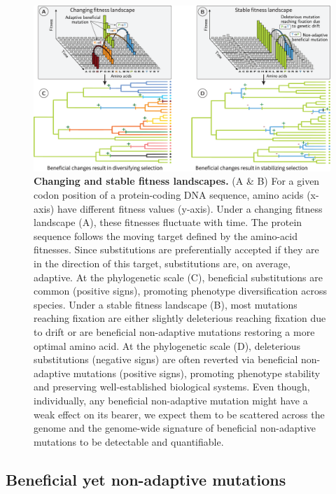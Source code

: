 \documentclass[10pt,letterpaper]{article}
\begin{document}
\begin{figure}[!htb]
\centering
\includegraphics[width=\textwidth, page=1] {figure1.eps}
\caption{
{\bf Changing and stable fitness landscapes.}
(A \& B) For a given codon position of a protein-coding DNA sequence, amino acids (x-axis) have different fitness values (y-axis).
Under a changing fitness landscape (A), these fitnesses fluctuate with time.
The protein sequence follows the moving target defined by the amino-acid fitnesses. Since substitutions are preferentially accepted if they are in the direction of this target, substitutions are, on average, adaptive.
At the phylogenetic scale (C), beneficial substitutions are common (positive signs), promoting phenotype diversification across species.
Under a stable fitness landscape (B), most mutations reaching fixation are either slightly deleterious reaching fixation due to drift or are beneficial non-adaptive mutations restoring a more optimal amino acid.
At the phylogenetic scale (D), deleterious substitutions (negative signs) are often reverted via beneficial non-adaptive mutations (positive signs), promoting phenotype stability and preserving well-established biological systems.
Even though, individually, any beneficial non-adaptive mutation might have a weak effect on its bearer, we expect them to be scattered across the genome and the genome-wide signature of beneficial non-adaptive mutations to be detectable and quantifiable.}
\label{fig:fitness-landscape}
\end{figure}

\subsection*{Beneficial yet non-adaptive mutations}
\end{document}
